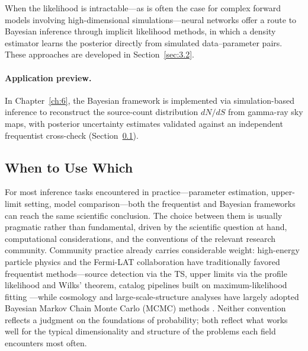 When the likelihood is intractable---as is often the case for complex forward models involving high-dimensional simulations---neural networks offer a route to Bayesian inference through implicit likelihood methods, in which a density estimator learns the posterior directly from simulated data--parameter pairs.
These approaches are developed in Section~\ref{sec:3.2}.

\paragraph{Application preview.}

In Chapter~\ref{ch:6}, the Bayesian framework is implemented via simulation-based inference to reconstruct the source-count distribution $dN/dS$ from gamma-ray sky maps, with posterior uncertainty estimates validated against an independent frequentist cross-check (Section~\ref{sec:3.1.4}).


\subsection{When to Use Which}
\label{sec:3.1.4}

For most inference tasks encountered in practice---parameter estimation, upper-limit setting, model comparison---both the frequentist and Bayesian frameworks can reach the same scientific conclusion.
The choice between them is usually pragmatic rather than fundamental, driven by the scientific question at hand, computational considerations, and the conventions of the relevant research community.
Community practice already carries considerable weight: high-energy particle physics and the Fermi-LAT collaboration have traditionally favored frequentist methods---source detection via the TS, upper limits via the profile likelihood and Wilks' theorem, catalog pipelines built on maximum-likelihood fitting \cite{Mattox:1996zz}---while cosmology and large-scale-structure analyses have largely adopted Bayesian Markov Chain Monte Carlo (MCMC) methods \cite{Hastie:2009}.
Neither convention reflects a judgment on the foundations of probability; both reflect what works well for the typical dimensionality and structure of the problems each field encounters most often.

